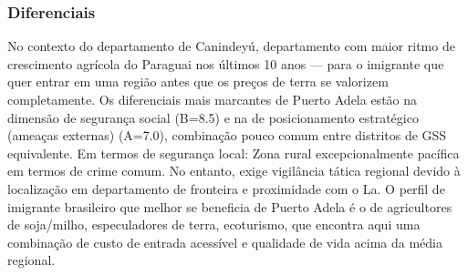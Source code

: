 \subsubsection*{Diferenciais}\label{dif-puerto-adela-1415}
No contexto do departamento de Canindeyú, departamento com maior ritmo de crescimento agrícola do Paraguai nos últimos 10 anos — para o imigrante que quer entrar em uma região antes que os preços de terra se valorizem completamente. Os diferenciais mais marcantes de Puerto Adela estão na dimensão de segurança social (B=8.5) e na de posicionamento estratégico (ameaças externas) (A=7.0), combinação pouco comum entre distritos de GSS equivalente. Em termos de segurança local: Zona rural excepcionalmente pacífica em termos de crime comum. No entanto, exige vigilância tática regional devido à localização em departamento de fronteira e proximidade com o La. O perfil de imigrante brasileiro que melhor se beneficia de Puerto Adela é o de agricultores de soja/milho, especuladores de terra, ecoturismo, que encontra aqui uma combinação de custo de entrada acessível e qualidade de vida acima da média regional.
